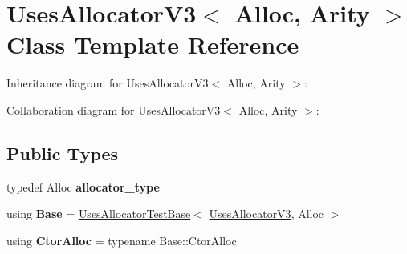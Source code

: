 \hypertarget{class_uses_allocator_v3}{}\section{Uses\+Allocator\+V3$<$ Alloc, Arity $>$ Class Template Reference}
\label{class_uses_allocator_v3}


Inheritance diagram for Uses\+Allocator\+V3$<$ Alloc, Arity $>$\+:


Collaboration diagram for Uses\+Allocator\+V3$<$ Alloc, Arity $>$\+:
\subsection*{Public Types}
\begin{DoxyCompactItemize}
\item 
\mbox{\label{class_uses_allocator_v3_a72523a671e295d41438916ab7c0c1852}} 
typedef Alloc {\bfseries allocator\+\_\+type}
\item 
\mbox{\label{class_uses_allocator_v3_acd67074b5ddad4fb06ad03a85d013838}} 
using {\bfseries Base} = \mbox{\hyperlink{struct_uses_allocator_test_base}{Uses\+Allocator\+Test\+Base}}$<$ \mbox{\hyperlink{class_uses_allocator_v3}{Uses\+Allocator\+V3}}, Alloc $>$
\item 
\mbox{\label{class_uses_allocator_v3_abc87ce4966f33f3d7db92eabd9bb1559}} 
using {\bfseries Ctor\+Alloc} = typename Base\+::\+Ctor\+Alloc
\end{DoxyCompactItemize}
